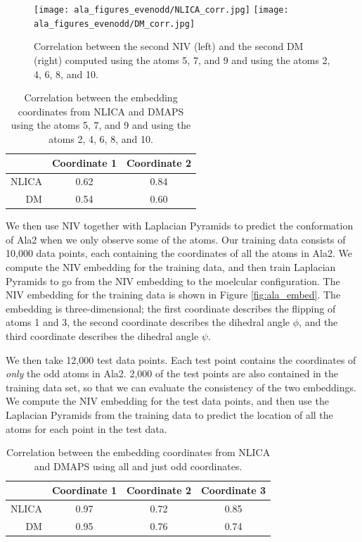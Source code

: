 \documentclass[twocolumn]{revtex4}
\begin{document}
\begin{figure}[ht]
    \texttt{[image: ala\_figures\_evenodd/NLICA\_corr.jpg]}
    \texttt{[image: ala\_figures\_evenodd/DM\_corr.jpg]}
    \caption{Correlation between the second NIV (left) and the second DM (right) computed using the atoms 5, 7, and 9 and using the atoms 2, 4, 6, 8, and 10.}
    \label{fig:ala_corr}
\end{figure}

\begin{table}
\begin{tabular}{| r || c | c |}
  \hline
  & Coordinate 1 & Coordinate 2 \\
  \hline
  \hline
  NLICA & 0.62 & 0.84 \\
  \hline
  DM & 0.54 & 0.60 \\
  \hline
\end{tabular}
\caption{Correlation between the embedding coordinates from NLICA and DMAPS using the atoms 5, 7, and 9 and using the atoms 2, 4, 6, 8, and 10.}
\end{table}

We then use NIV together with Laplacian Pyramids to predict the conformation of Ala2 when we only observe some of the atoms.
%
Our training data consists of 10,000 data points, each containing the coordinates of all the atoms in Ala2.
%
We compute the NIV embedding for the training data, and then train Laplacian Pyramids to go from the NIV embedding to the moelcular configuration.
%
The NIV embedding for the training data is shown in Figure \ref{fig:ala_embed}.
%
The embedding is three-dimensional; the first coordinate describes the flipping of atoms 1 and 3, the second coordinate describes the dihedral angle $\phi$, and the third coordinate describes the dihedral angle $\psi$.

We then take 12,000 test data points.
%
Each test point contains the coordinates of {\em only} the odd atoms in Ala2.
%
2,000 of the test points are also contained in the training data set, so that we can evaluate the consistency of the two embeddings.
%
We compute the NIV embedding for the test data points, and then use the Laplacian Pyramids from the training data to predict the location of all the atoms for each point in the test data.

\begin{table}
\begin{tabular}{| r || c | c | c |}
  \hline
  & Coordinate 1 & Coordinate 2 & Coordinate 3 \\
  \hline
  \hline
  NLICA & 0.97 & 0.72 & 0.85 \\
  \hline
  DM & 0.95 & 0.76 & 0.74 \\
  \hline
\end{tabular}
\caption{Correlation between the embedding coordinates from NLICA and DMAPS using all and just odd coordinates.}
\end{table}
\end{document}
